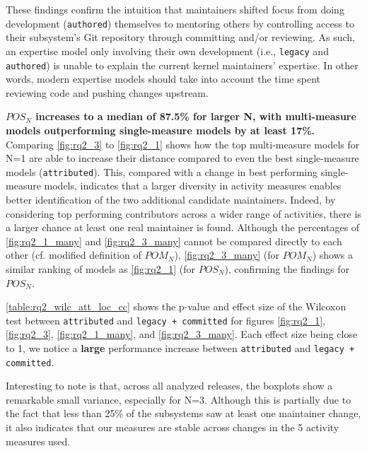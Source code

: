 These findings confirm the intuition that maintainers shifted focus from doing development (\texttt{authored}) themselves to mentoring others by controlling access to their subsystem's Git repository through committing and/or reviewing. As such, an expertise model only involving their own development (i.e., \texttt{legacy} and \texttt{authored}) is unable to explain the current kernel maintainers' expertise. In other words, modern expertise models should take into account the time spent reviewing code and pushing changes upstream.%


\textbf{$POS_N$ increases to a median of 87.5\% for larger N, with multi-measure models outperforming single-measure models by at least 17\%.} Comparing \autoref{fig:rq2_3} to \autoref{fig:rq2_1} shows how the top multi-measure models for N=1 are able to increase their distance compared to even the best single-measure models (\texttt{attributed}). This, compared with a change in best performing single-measure models, indicates that a larger diversity in activity measures enables better identification of the two additional candidate maintainers. Indeed, by considering top performing contributors across a wider range of activities, there is a larger chance at least one real maintainer is found. Although the percentages of \autoref{fig:rq2_1_many} and \autoref{fig:rq2_3_many} cannot be compared directly to each other (cf. modified definition of $POM_N$), \autoref{fig:rq2_3_many} (for $POM_N$) shows a similar ranking of models as \autoref{fig:rq2_1} (for $POS_N$), confirming the findings for $POS_N$.

\autoref{table:rq2_wilc_att_loc_cc} shows the p-value and effect size of the Wilcoxon test between \texttt{attributed} and \texttt{legacy + committed} for figures \ref{fig:rq2_1}, \ref{fig:rq2_3}, \ref{fig:rq2_1_many}, and \ref{fig:rq2_3_many}. Each effect size being close to 1, we notice a \textbf{large} performance increase between \texttt{attributed} and \texttt{legacy + committed}.

Interesting to note is that, across all analyzed releases, the boxplots show a remarkable small variance, especially for N=3. Although this is partially due to the fact that less than 25\% of the subsystems saw at least one maintainer change, it also indicates that our measures are stable across changes in the 5 activity measures used.%

